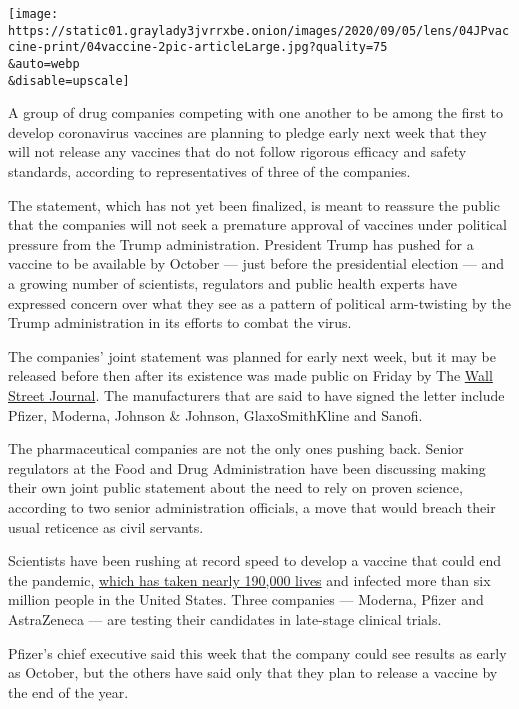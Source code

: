 \texttt{[image: https://static01.graylady3jvrrxbe.onion/images/2020/09/05/lens/04JPvaccine-print/04vaccine-2pic-articleLarge.jpg?quality=75\\\&auto=webp\\\&disable=upscale]}

A group of drug companies competing with one another to be among the
first to develop coronavirus vaccines are planning to pledge early next
week that they will not release any vaccines that do not follow rigorous
efficacy and safety standards, according to representatives of three of
the companies.

The statement, which has not yet been finalized, is meant to reassure
the public that the companies will not seek a premature approval of
vaccines under political pressure from the Trump administration.
President Trump has pushed for a vaccine to be available by October ---
just before the presidential election --- and a growing number of
scientists, regulators and public health experts have expressed concern
over what they see as a pattern of political arm-twisting by the Trump
administration in its efforts to combat the virus.

The companies' joint statement was planned for early next week, but it
may be released before then after its existence was made public on
Friday by The
\href{https://www.wsj.com/articles/covid-19-vaccine-developers-prepare-joint-pledge-on-safety-standards-11599257729?mod=hp_lead_pos2}{Wall
Street Journal}. The manufacturers that are said to have signed the
letter include Pfizer, Moderna, Johnson \& Johnson, GlaxoSmithKline and
Sanofi.

The pharmaceutical companies are not the only ones pushing back. Senior
regulators at the Food and Drug Administration have been discussing
making their own joint public statement about the need to rely on proven
science, according to two senior administration officials, a move that
would breach their usual reticence as civil servants.

Scientists have been rushing at record speed to develop a vaccine that
could end the pandemic,
\href{https://www.nytimes3xbfgragh.onion/interactive/2020/us/coronavirus-us-cases.html}{which
has taken nearly 190,000 lives} and infected more than six million
people in the United States. Three companies --- Moderna, Pfizer and
AstraZeneca --- are testing their candidates in late-stage clinical
trials.

Pfizer's chief executive said this week that the company could see
results as early as October, but the others have said only that they
plan to release a vaccine by the end of the year.

